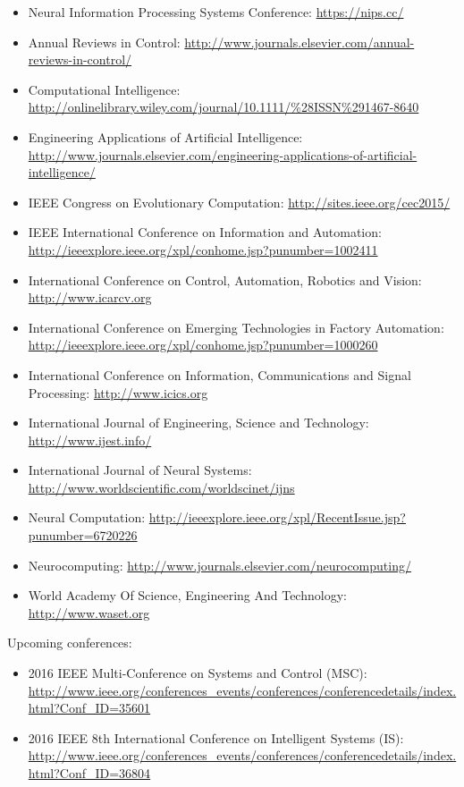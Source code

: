 \documentclass[a4paper,10pt]{article}
\begin{document}
\begin{itemize}
 \item Neural Information Processing Systems Conference: \url{https://nips.cc/}
 \item Annual Reviews in Control: \url{http://www.journals.elsevier.com/annual-reviews-in-control/}
 \item Computational Intelligence: \url{http://onlinelibrary.wiley.com/journal/10.1111/%28ISSN%291467-8640}
 \item Engineering Applications of Artificial Intelligence: \url{http://www.journals.elsevier.com/engineering-applications-of-artificial-intelligence/}
 \item IEEE Congress on Evolutionary Computation: \url{http://sites.ieee.org/cec2015/}
 \item IEEE International Conference on Information and Automation: \url{http://ieeexplore.ieee.org/xpl/conhome.jsp?punumber=1002411}
 \item International Conference on Control, Automation, Robotics and Vision: \url{http://www.icarcv.org}
 \item International Conference on Emerging Technologies in Factory Automation: \url{http://ieeexplore.ieee.org/xpl/conhome.jsp?punumber=1000260}
 \item International Conference on Information, Communications and Signal Processing: \url{http://www.icics.org}
 \item International Journal of Engineering, Science and Technology: \url{http://www.ijest.info/}
 \item International Journal of Neural Systems: \url{http://www.worldscientific.com/worldscinet/ijns}
 \item Neural Computation: \url{http://ieeexplore.ieee.org/xpl/RecentIssue.jsp?punumber=6720226}
 \item Neurocomputing: \url{http://www.journals.elsevier.com/neurocomputing/}
 \item World Academy Of Science, Engineering And Technology: \url{http://www.waset.org}
\end{itemize}
Upcoming conferences:
\begin{itemize}
 \item 2016 IEEE Multi-Conference on Systems and Control (MSC): \url{http://www.ieee.org/conferences_events/conferences/conferencedetails/index.html?Conf_ID=35601}
 \item 2016 IEEE 8th International Conference on Intelligent Systems (IS): \url{http://www.ieee.org/conferences_events/conferences/conferencedetails/index.html?Conf_ID=36804}
\end{itemize}


\end{document}
